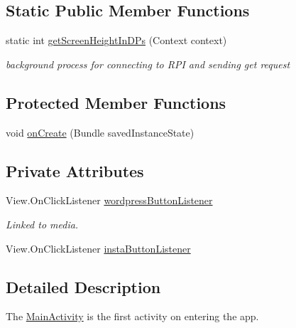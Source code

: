 \subsection*{Static Public Member Functions}
\begin{DoxyCompactItemize}
\item 
static int \mbox{\hyperlink{classcom_1_1example_1_1trainawearapplication_1_1_main_activity_a9602d3869b7b5392704fbf9fc2b041a9}{get\+Screen\+Height\+In\+D\+Ps}} (Context context)
\begin{DoxyCompactList}\small\item\em background process for connecting to R\+PI and sending get request \end{DoxyCompactList}\end{DoxyCompactItemize}
\subsection*{Protected Member Functions}
\begin{DoxyCompactItemize}
\item 
void \mbox{\hyperlink{classcom_1_1example_1_1trainawearapplication_1_1_main_activity_ab22dede000985c356ec6d4419f3d2825}{on\+Create}} (Bundle saved\+Instance\+State)
\end{DoxyCompactItemize}
\subsection*{Private Attributes}
\begin{DoxyCompactItemize}
\item 
View.\+On\+Click\+Listener \mbox{\hyperlink{classcom_1_1example_1_1trainawearapplication_1_1_main_activity_a24be9aa01bd26567f9846c8007a979bd}{wordpress\+Button\+Listener}}
\begin{DoxyCompactList}\small\item\em Linked to media. \end{DoxyCompactList}\item 
View.\+On\+Click\+Listener \mbox{\hyperlink{classcom_1_1example_1_1trainawearapplication_1_1_main_activity_a46b1c1063fc63c8850150682ceef4d5b}{insta\+Button\+Listener}}
\end{DoxyCompactItemize}


\subsection{Detailed Description}
The \mbox{\hyperlink{classcom_1_1example_1_1trainawearapplication_1_1_main_activity}{Main\+Activity}} is the first activity on entering the app. 

